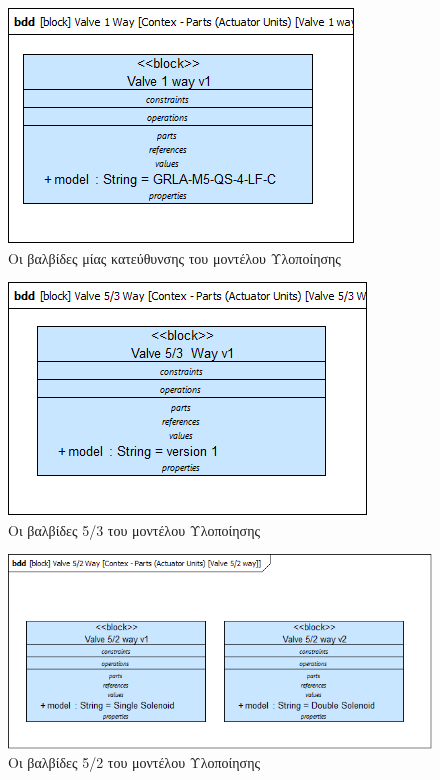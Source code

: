 \documentclass[a4paper,12pt,twoside]{report}
\begin{document}
{\begin{appendices}
				\begin{figure}[hp]
					\centering
					\includegraphics[scale=0.50]{DesignModel_Contex-Parts(ActuatorUnits)[Valve1way].png}
					\caption{Οι βαλβίδες μίας κατεύθυνσης του μοντέλου Υλοποίησης}
					\label{φωτ:Οι βαλβίδες μίας κατεύθυνσης του μοντέλου Υλοποίησης}
				\end{figure}
				
				\begin{figure}[hp]
					\centering
					\includegraphics[scale=0.50]{DesignModel_Contex-Parts(ActuatorUnits)[Valve5-3Way].png}
					\caption{Οι βαλβίδες 5/3 του μοντέλου Υλοποίησης}
					\label{φωτ:Οι βαλβίδες 5/3 του μοντέλου Υλοποίησης}
				\end{figure}
				
				\begin{figure}[hp]
					\centering
					\includegraphics[scale=0.50]{DesignModel_Contex-Parts(ActuatorUnits)[Valve5-2way].png}
					\caption{Οι βαλβίδες 5/2 του μοντέλου Υλοποίησης}
					\label{φωτ:Οι βαλβίδες 5/2 του μοντέλου Υλοποίησης}
				\end{figure}
				

\end{appendices}}
\end{document}
